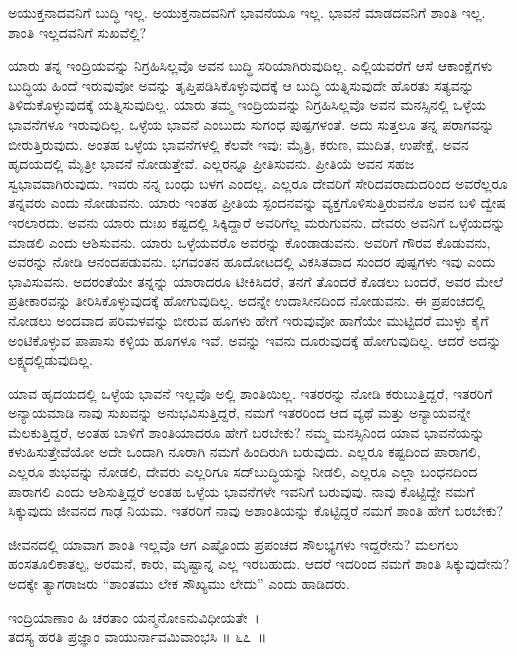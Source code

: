 \begin{artha}
ಅಯುಕ್ತನಾದವನಿಗೆ ಬುದ್ಧಿ ಇಲ್ಲ. ಅಯುಕ್ತನಾದವನಿಗೆ ಭಾವನೆಯೂ ಇಲ್ಲ. ಭಾವನೆ ಮಾಡದವನಿಗೆ ಶಾಂತಿ ಇಲ್ಲ. ಶಾಂತಿ ಇಲ್ಲದವನಿಗೆ ಸುಖವೆಲ್ಲಿ?
\end{artha}

ಯಾರು ತನ್ನ ಇಂದ್ರಿಯವನ್ನು ನಿಗ್ರಹಿಸಿಲ್ಲವೊ ಅವನ ಬುದ್ಧಿ ಸರಿಯಾಗಿರುವುದಿಲ್ಲ. ಎಲ್ಲಿಯವರೆಗೆ ಆಸೆ ಆಕಾಂಕ್ಷೆಗಳು ಬುದ್ಧಿಯ ಹಿಂದೆ ಇರುವುವೋ ಅವನ್ನು ತೃಪ್ತಿಪಡಿಸಿಕೊಳ್ಳುವುದಕ್ಕೆ ಆ ಬುದ್ಧಿ ಯತ್ನಿಸುವುದೇ ಹೊರತು ಸತ್ಯವನ್ನು ತಿಳಿದುಕೊಳ್ಳುವುದಕ್ಕೆ ಯತ್ನಿಸುವುದಿಲ್ಲ. ಯಾರು ತಮ್ಮ ಇಂದ್ರಿಯವನ್ನು ನಿಗ್ರಹಿಸಿಲ್ಲವೊ ಅವನ ಮನಸ್ಸಿನಲ್ಲಿ ಒಳ್ಳೆಯ ಭಾವನೆಗಳೂ ಇರುವುದಿಲ್ಲ. ಒಳ್ಳೆಯ ಭಾವನೆ ಎಂಬುದು ಸುಗಂಧ ಪುಷ್ಪಗಳಂತೆ. ಅದು ಸುತ್ತಲೂ ತನ್ನ ಪರಾಗವನ್ನು ಬೀರುತ್ತಿರುವುದು. ಅಂತಹ ಒಳ್ಳೆಯ ಭಾವನೆಗಳಲ್ಲಿ ಕೆಲವೇ ಇವು: ಮೈತ್ರಿ, ಕರುಣ, ಮುದಿತ, ಉಪೇಕ್ಷೆ. ಅವನ ಹೃದಯದಲ್ಲಿ ಮೈತ್ರೀ ಭಾವನೆ ನೋಡುತ್ತೇವೆ. ಎಲ್ಲರನ್ನೂ ಪ್ರೀತಿಸುವನು. ಪ್ರೀತಿಯೆ ಅವನ ಸಹಜ ಸ್ವಭಾವವಾಗಿರುವುದು. ಇವರು ನನ್ನ ಬಂಧು ಬಳಗ ಎಂದಲ್ಲ. ಎಲ್ಲರೂ ದೇವರಿಗೆ ಸೇರಿದವರಾದುದರಿಂದ ಅವರೆಲ್ಲರೂ ತನ್ನವರು ಎಂದು ನೋಡುವನು. ಯಾರು ಇಂತಹ ಪ್ರೀತಿಯ ಸ್ಪಂದನವನ್ನು ವ್ಯಕ್ತಗೊಳಿಸುತ್ತಿರುವನೊ ಅವನ ಬಳಿ ದ್ವೇಷ ಇರಲಾರದು. ಅವನು ಯಾರು ದುಃಖ ಕಷ್ಟದಲ್ಲಿ ಸಿಕ್ಕಿದ್ದಾರೆ ಅವರಿಗೆಲ್ಲ ಮರುಗುವನು. ದೇವರು ಅವನಿಗೆ ಒಳ್ಳೆಯದನ್ನು ಮಾಡಲಿ ಎಂದು ಆಶಿಸುವನು. ಯಾರು ಒಳ್ಳೆಯವರೊ ಅವರನ್ನು ಕೊಂಡಾಡುವನು. ಅವರಿಗೆ ಗೌರವ ಕೊಡುವನು, ಅವರನ್ನು ನೋಡಿ ಆನಂದಪಡುವನು. ಭಗವಂತನ ಹೂದೋಟದಲ್ಲಿ ವಿಕಸಿತವಾದ ಸುಂದರ ಪುಷ್ಪಗಳು ಇವು ಎಂದು ಭಾವಿಸುವನು. ಅದರಂತೆಯೇ ತನ್ನನ್ನು ಯಾರಾದರೂ ಟೀಕಿಸಿದರೆ, ತನಗೆ ತೊಂದರೆ ಕೊಡಲು ಬಂದರೆ, ಅವರ ಮೇಲೆ ಪ್ರತೀಕಾರವನ್ನು ತೀರಿಸಿಕೊಳ್ಳುವುದಕ್ಕೆ ಹೋಗುವುದಿಲ್ಲ. ಅದನ್ನೇ ಉದಾಸೀನದಿಂದ ನೋಡುವನು. ಈ ಪ್ರಪಂಚದಲ್ಲಿ ನೋಡಲು ಅಂದವಾದ ಪರಿಮಳವನ್ನು ಬೀರುವ ಹೂಗಳು ಹೇಗೆ ಇರುವುವೋ ಹಾಗೆಯೇ ಮುಟ್ಟಿದರೆ ಮುಳ್ಳು ಕೈಗೆ ಅಂಟಿಕೊಳ್ಳುವ ಪಾಪಾಸು ಕಳ್ಳಿಯ ಹೂಗಳೂ ಇವೆ. ಅವನ್ನು ಇವನು ದೂರುವುದಕ್ಕೆ ಹೋಗುವುದಿಲ್ಲ. ಆದರೆ ಅದನ್ನು ಲಕ್ಷ್ಯದಲ್ಲಿಡುವುದಿಲ್ಲ.

ಯಾವ ಹೃದಯದಲ್ಲಿ ಒಳ್ಳೆಯ ಭಾವನೆ ಇಲ್ಲವೊ ಅಲ್ಲಿ ಶಾಂತಿಯಿಲ್ಲ. ಇತರರನ್ನು ನೋಡಿ ಕರುಬುತ್ತಿದ್ದರೆ, ಇತರರಿಗೆ ಅನ್ಯಾಯಮಾಡಿ ನಾವು ಸುಖವನ್ನು ಅನುಭವಿಸುತ್ತಿದ್ದರೆ, ನಮಗೆ ಇತರರಿಂದ ಆದ ವ್ಯಥೆ ಮತ್ತು ಅನ್ಯಾಯವನ್ನೇ ಮೆಲಕುತ್ತಿದ್ದರೆ, ಅಂತಹ ಬಾಳಿಗೆ ಶಾಂತಿಯಾದರೂ ಹೇಗೆ ಬರಬೇಕು? ನಮ್ಮ ಮನಸ್ಸಿನಿಂದ ಯಾವ ಭಾವನೆಯನ್ನು ಕಳುಹಿಸುತ್ತೇವೆಯೋ ಅದೇ ಒಂದಾಗಿ ನೂರಾಗಿ ನಮಗೆ ಹಿಂದಿರುಗಿ ಬರುವುದು. ಎಲ್ಲರೂ ಕಷ್ಟದಿಂದ ಪಾರಾಗಲಿ, ಎಲ್ಲರೂ ಶುಭವನ್ನು ನೋಡಲಿ, ದೇವರು ಎಲ್ಲರಿಗೂ ಸದ್​ಬುದ್ಧಿಯನ್ನು ನೀಡಲಿ, ಎಲ್ಲರೂ ಎಲ್ಲಾ ಬಂಧನದಿಂದ ಪಾರಾಗಲಿ ಎಂದು ಆಶಿಸುತ್ತಿದ್ದರೆ ಅಂತಹ ಒಳ್ಳೆಯ ಭಾವನೆಗಳೇ ಇವನಿಗೆ ಬರುವುವು. ನಾವು ಕೊಟ್ಟಿದ್ದೇ ನಮಗೆ ಸಿಕ್ಕುವುದು ಜೀವನದ ಗಾಢ ನಿಯಮ. ಇತರರಿಗೆ ನಾವು ಅಶಾಂತಿಯನ್ನು ಕೊಟ್ಟಿದ್ದರೆ ನಮಗೆ ಶಾಂತಿ ಹೇಗೆ ಬರಬೇಕು?

ಜೀವನದಲ್ಲಿ ಯಾವಾಗ ಶಾಂತಿ ಇಲ್ಲವೊ ಆಗ ಎಷ್ಟೊಂದು ಪ್ರಪಂಚದ ಸೌಲಭ್ಯಗಳು ಇದ್ದರೇನು? ಮಲಗಲು ಹಂಸತೂಲಿಕಾತಲ್ಪ, ಅರಮನೆ, ಕಾರು, ಮೃಷ್ಟಾನ್ನ ಎಲ್ಲ ಇರಬಹುದು. ಆದರೆ ಇದರಿಂದ ನಮಗೆ ಶಾಂತಿ ಸಿಕ್ಕುವುದೇನು? ಅದಕ್ಕೇ ತ್ಯಾಗರಾಜರು “ಶಾಂತಮು ಲೇಕ ಸೌಖ್ಯಮು ಲೇದು” ಎಂದು ಹಾಡಿದರು.

\begin{shloka}
ಇಂದ್ರಿಯಾಣಾಂ ಹಿ ಚರತಾಂ ಯನ್ಮನೋಽನುವಿಧೀಯತೇ~।\\ತದಸ್ಯ ಹರತಿ ಪ್ರಜ್ಞಾಂ ವಾಯುರ್ನಾವಮಿವಾಂಭಸಿ \hfill॥ ೬೭~॥
\end{shloka}


